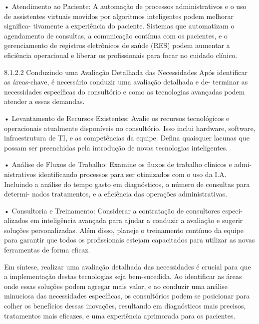     • Atendimento ao Paciente: A automação de processos administrativos e o uso de
      assistentes virtuais movidos por algoritmos inteligentes podem melhorar significa-
      tivamente a experiência do paciente. Sistemas que automatizam o agendamento
      de consultas, a comunicação contínua com os pacientes, e o gerenciamento de
      registros eletrônicos de saúde (RES) podem aumentar a eficiência operacional e
      liberar os profissionais para focar no cuidado clínico.

8.1.2.2   Conduzindo uma Avaliação Detalhada das Necessidades
Após identificar as áreas-chave, é necessário conduzir uma avaliação detalhada e de-
terminar as necessidades específicas do consultório e como as tecnologias avançadas
podem atender a essas demandas.

    • Levantamento de Recursos Existentes: Avalie os recursos tecnológicos e
      operacionais atualmente disponíveis no consultório. Isso inclui hardware, software,
      infraestrutura de TI, e as competências da equipe. Defina quaisquer lacunas que
      possam ser preenchidas pela introdução de novas tecnologias inteligentes.

    • Análise de Fluxos de Trabalho: Examine os fluxos de trabalho clínicos e admi-
      nistrativos identificando processos para ser otimizados com o uso da I.A. Incluindo
      a análise do tempo gasto em diagnósticos, o número de consultas para determi-
      nados tratamentos, e a eficiência das operações administrativas.

    • Consultoria e Treinamento: Considerar a contratação de consultores especi-
      alizados em inteligência avançada para ajudar a conduzir a avaliação e sugerir
      soluções personalizadas. Além disso, planeje o treinamento contínuo da equipe
      para garantir que todos os profissionais estejam capacitados para utilizar as novas
      ferramentas de forma eficaz.

        Em síntese, realizar uma avaliação detalhada das necessidades é crucial para
que a implementação destas tecnologias seja bem-sucedida. Ao identificar as áreas
onde essas soluções podem agregar mais valor, e ao conduzir uma análise minuciosa
das necessidades específicas, os consultórios podem se posicionar para colher os
benefícios dessas inovações, resultando em diagnósticos mais precisos, tratamentos
mais eficazes, e uma experiência aprimorada para os pacientes.


